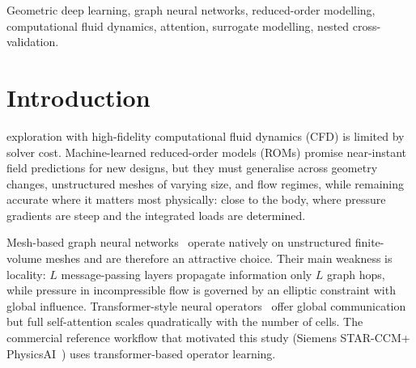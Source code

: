 \documentclass[journal]{IEEEtran}
\begin{document}
\begin{IEEEkeywords}
Geometric deep learning, graph neural networks, reduced-order modelling,
computational fluid dynamics, attention, surrogate modelling, nested cross-validation.
\end{IEEEkeywords}

\section{Introduction}
 exploration with high-fidelity computational fluid dynamics
(CFD) is limited by solver cost. Machine-learned reduced-order models (ROMs)
promise near-instant field predictions for new designs, but they must generalise
across geometry changes, unstructured meshes of varying size, and flow regimes,
while remaining accurate where it matters most physically: close to the body,
where pressure gradients are steep and the integrated loads are determined.

Mesh-based graph neural networks~\cite{battaglia2018,gilmer2017,pfaff2021}
operate natively on unstructured finite-volume meshes and are therefore an
attractive choice. Their main weakness is locality: $L$ message-passing layers
propagate information only $L$ graph hops, while pressure in incompressible flow
is governed by an elliptic constraint with global influence. Transformer-style
neural operators~\cite{vaswani2017,hao2023gnot,wu2024transolver} offer global
communication but full self-attention scales quadratically with the number of
cells. The commercial reference workflow that motivated this study (Siemens
STAR-CCM+ PhysicsAI~\cite{siemens_train,siemens_validate,siemens_ref,siemens_theory})
uses transformer-based operator learning.
\end{document}
